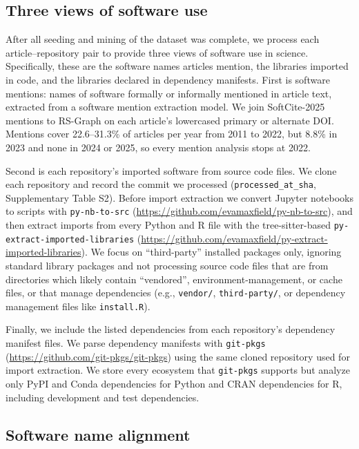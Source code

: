 \documentclass[pdflatex,sn-nature]{sn-jnl}%
\begin{document}
\subsection{Three views of software use}\label{subsec:m-views}

After all seeding and mining of the dataset was complete, we process each article--repository pair to provide three views of software use in science.
Specifically, these are the software names articles mention, the libraries imported in code, and the libraries declared in dependency manifests.
First is software mentions: names of software formally or informally mentioned in article text, extracted from a software mention extraction model.
We join SoftCite-2025 mentions to RS-Graph on each article's lowercased primary or alternate DOI.
Mentions cover 22.6--31.3\% of articles per year from 2011 to 2022, but 8.8\% in 2023 and none in 2024 or 2025, so every mention analysis stops at 2022.

Second is each repository's imported software from source code files.
We clone each repository and record the commit we processed (\texttt{processed\_at\_sha}, Supplementary Table S2).
Before import extraction we convert Jupyter notebooks to scripts with \texttt{py-nb-to-src} (\url{https://github.com/evamaxfield/py-nb-to-src}), and then extract imports from every Python and R file with the tree-sitter-based \texttt{py-extract-imported-libraries} (\url{https://github.com/evamaxfield/py-extract-imported-libraries}).
We focus on ``third-party'' installed packages only, ignoring standard library packages and not processing source code files that are from directories which likely contain ``vendored'', environment-management, or cache files, or that manage dependencies (e.g., \texttt{vendor/}, \texttt{third-party/}, or dependency management files like \texttt{install.R}).

Finally, we include the listed dependencies from each repository's dependency manifest files.
We parse dependency manifests with \texttt{git-pkgs} (\url{https://github.com/git-pkgs/git-pkgs}) using the same cloned repository used for import extraction.
We store every ecosystem that \texttt{git-pkgs} supports but analyze only PyPI and Conda dependencies for Python and CRAN dependencies for R, including development and test dependencies.

\subsection{Software name alignment}\label{subsec:m-alignment}
\end{document}
